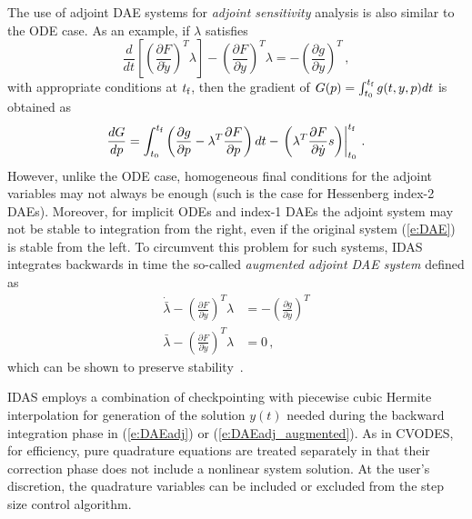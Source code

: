 The use of adjoint DAE systems for {\em adjoint sensitivity} analysis is also
similar to the ODE case. As an example, if $\lambda$ satisfies 
\begin{equation}\label{e:DAEadj} 
  \frac{d}{dt} \left[ \left( \frac{\partial F}{\partial \dot{y}}\right) ^T \lambda \right] 
  - \left(\frac{\partial F}{\partial y}\right)^T \lambda 
  = - \left( \frac{\partial g}{\partial y}\right)^T \, ,
\end{equation}
with appropriate conditions at $t_{\mbox{\scriptsize f}}$, then the gradient of 
$G(p) = \int_{t_0}^{t_{\mbox{\tiny f}}} g(t,y,p) dt$ is obtained as
\begin{equation*}
  \frac{dG}{dp} = 
  \int_{t_0}^{t_{\mbox{\tiny f}}} \left(
    \frac{\partial g}{\partial p} - \lambda^T \frac{\partial F}{\partial p}
  \right) dt 
  - \left.\left( 
      \lambda^T \frac{\partial F}{\partial \dot{y}} s 
    \right)\right|_{t_0}^{t_{\mbox{\tiny f}}} \, . 
\end{equation*}
However, unlike the ODE case, homogeneous final conditions for the 
adjoint variables may not always be enough (such is the case for 
Hessenberg index-2 DAEs).
%
Moreover, for implicit ODEs and index-1 DAEs the adjoint system may not
be stable to integration from the right, even if the original system (\ref{e:DAE}) 
is stable from the left. To circumvent this problem for such
systems, IDAS integrates backwards in time the so-called 
{\em augmented adjoint DAE system} defined as
\begin{equation} \label{e:DAEadj_augmented}
\begin{split}
  \dot {\bar\lambda} -  \left(\frac{\partial F}{\partial y}\right)^T \lambda 
  &  = - \left( \frac{\partial g}{\partial y}\right)^T \\
  \bar \lambda - \left( \frac{\partial F}{\partial \dot{y}}\right) ^T \lambda 
  & = 0 \, ,
\end{split}
\end{equation}
which can be shown to preserve stability~\cite{CLPS:03}.

IDAS employs a combination of checkpointing with piecewise cubic Hermite 
interpolation for generation of the solution $y(t)$ needed during the
backward integration phase in (\ref{e:DAEadj}) or (\ref{e:DAEadj_augmented}).
As in CVODES, for efficiency, pure quadrature equations are treated separately
in that their correction phase does not include a nonlinear system solution.
At the user's discretion, the quadrature variables can be included or excluded
from the step size control algorithm.
 
